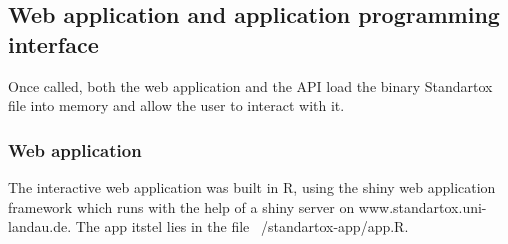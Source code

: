 \subsection*{Web application and application programming interface}

Once called, both the web application and the API load the binary Standartox file into memory and allow the user to interact with it. 

\subsubsection*{Web application}
The interactive web application was built in R, using the shiny web application framework \citep{chang_shiny_2018} which runs with the help of a shiny server \citep{HOW-TO-CITE-SHINY-SERVER} on www.standartox.uni-landau.de. The app itstel lies in the file ~/standartox-app/app.R.

